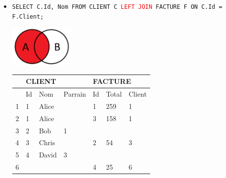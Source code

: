 \documentclass[a4paper]{article}
\begin{document}
\begin{itemize}
\begin{itemize}
    \item \texttt{SELECT C.Id, Nom FROM CLIENT C \textcolor{red}{LEFT JOIN} FACTURE F ON C.Id = F.Client;}
    \begin{center}
        \includegraphics[width=0.25\textwidth]{../images/left-join-01.PNG}
    \end{center}
    \begin{center}
        \begin{tabular}{|l|l|l|l|l|l|l|} \hline
            & \multicolumn{3}{l|}{CLIENT} & \multicolumn{3}{l|}{FACTURE} \\ \hline
            & Id & Nom & Parrain & Id & Total & Client \\ \hline
            \rowcolor{orange!30}
            1 & 1 & Alice &   & 1 & 259 & 1 \\ \hline
            \rowcolor{orange!30}
            2 & 1 & Alice &   & 3 & 158 & 1 \\ \hline
            \rowcolor{orange!30}
            3 & 2 &   Bob & 1 &   &     &   \\ \hline
            \rowcolor{orange!30}
            4 & 3 & Chris &   & 2 &  54 & 3 \\ \hline
            \rowcolor{orange!30}
            5 & 4 & David & 3 &   &     &   \\ \hline
            6 &   &       &   & 4 &  25 & 6 \\ \hline
        \end{tabular}
    \end{center}



\end{itemize}
\end{itemize}
\end{document}
